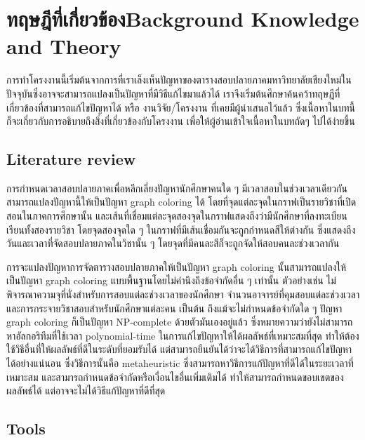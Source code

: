 \chapter{\ifcpe ทฤษฎีที่เกี่ยวข้อง\else Background Knowledge and Theory\fi}

การทำโครงงานนี้เริ่มต้นจากการที่เราเล็งเห็นปัญหาของตารางสอบปลายภาคมหาวิทยาลัยเชียงใหม่ในปัจจุบันซึ่งอาจจะสามารถแปลงเป็นปัญหาที่มีวิธีแก้ไขมาแล้วได้ เราจึงเริ่มต้นศึกษาค้นคว้าทฤษฎีที่เกี่ยวข้องที่สามารถแก้ไขปัญหาได้ หรือ งานวิจัย/โครงงาน ที่เคยมีผู้นำเสนอไว้แล้ว
ซึ่งเนื้อหาในบทนี้ก็จะเกี่ยวกับการอธิบายถึงสิ่งที่เกี่ยวข้องกับโครงงาน เพื่อให้ผู้อ่านเข้าใจเนื้อหาในบทถัดๆ ไปได้ง่ายขึ้น
\section{Literature review}
การกำหนดเวลาสอบปลายภาคเพื่อหลีกเลี่ยงปัญหานักศึกษาคนใด ๆ มีเวลาสอบในช่วงเวลาเดียวกันสามารถแปลงปัญหานี้ให้เป็นปัญหา graph coloring ได้ 
โดยที่จุดแต่ละจุดในกราฟเป็นรายวิชาที่เปิดสอนในภาคการศึกษานั้น 
และเส้นที่เชื่อมแต่ละจุดสองจุดในกราฟแสดงถึงว่ามีนักศึกษาที่ลงทะเบียนเรียนทั้งสองรายวิชา โดยจุดสองจุดใด ๆ ในกราฟที่มีเส้นเชื่อมกันจะถูกกำหนดสีให้ต่างกัน
ซึ่งแสดงถึงวันและเวลาที่จัดสอบปลายภาคในวิชานั้น ๆ โดยจุดที่มีคนละสีก็จะถูกจัดให้สอบคนละช่วงเวลากัน

การจะแปลงปัญหาการจัดตารางสอบปลายภาคให้เป็นปัญหา graph coloring นั้นสามารถแปลงให้เป็นปัญหา graph coloring แบบพื้นฐานโดยไม่คำนึงถึงข้อจำกัดอื่น ๆ เท่านั้น\cite{mcs} 
ตัวอย่างเช่น ไม่พิจารณาความจุที่นั่งสำหรับการสอบแต่ละช่วงเวลาของนักศึกษา จำนวนอาจารย์ที่คุมสอบแต่ละช่วงเวลา และการกระจายวิชาสอบสำหรับนักศึกษาแต่ละคน เป็นต้น
ถึงแม้จะไม่กำหนดข้อจำกัดใด ๆ ปัญหา graph coloring ก็เป็นปัญหา NP-complete ด้วยตัวมันเองอยู่แล้ว\cite{alg-design} 
ซึ่งหมายความว่ายังไม่สามารถหาอัลกอริทึมที่ใช้เวลา polynomial-time ในการแก้ไขปัญหาให้ได้ผลลัพธ์ที่เหมาะสมที่สุด 
ทำให้ต้องใช้วิธีอื่นที่ให้ผลลัพธ์ที่ดีในระดับที่ยอมรับได้ แต่สามารถยืนยันได้ว่าจะได้วิธีการที่สามารถแก้ไขปัญหาได้อย่างแน่นอน 
ซึ่งวิธีการนั้นคือ metaheuristic ซึ่งสามารถหาวิธีการแก้ปัญหาที่ดีได้ในระยะเวลาที่เหมาะสม \cite{meta-for-vertexcolor}
และสามารถกำหนดข้อจำกัดหรือเงื่อนไขอื่นเพิ่มเติมได้ ทำให้สามารถกำหนดขอบเขตของผลลัพธ์ได้ แต่อาจจะไม่ได้วิธีแก้ปัญหาที่ดีที่สุด
\section{Tools}

